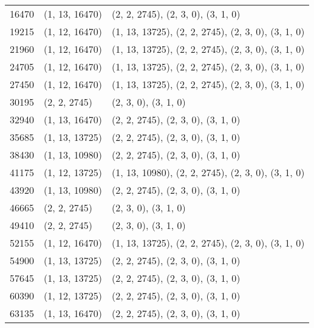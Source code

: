 \begin{longtable}{@{\extracolsep{\fill}}lll}
    16470              & (1, 13, 16470)              & (2, 2, 2745), (2, 3, 0), (3, 1, 0)                  \\
    19215              & (1, 12, 16470)              & (1, 13, 13725), (2, 2, 2745), (2, 3, 0), (3, 1, 0)  \\
    21960              & (1, 12, 16470)              & (1, 13, 13725), (2, 2, 2745), (2, 3, 0), (3, 1, 0)  \\
    24705              & (1, 12, 16470)              & (1, 13, 13725), (2, 2, 2745), (2, 3, 0), (3, 1, 0)  \\
    27450              & (1, 12, 16470)              & (1, 13, 13725), (2, 2, 2745), (2, 3, 0), (3, 1, 0)  \\
    30195              & (2, 2, 2745)                & (2, 3, 0), (3, 1, 0)                                \\
    32940              & (1, 13, 16470)              & (2, 2, 2745), (2, 3, 0), (3, 1, 0)                  \\
    35685              & (1, 13, 13725)              & (2, 2, 2745), (2, 3, 0), (3, 1, 0)                  \\
    38430              & (1, 13, 10980)              & (2, 2, 2745), (2, 3, 0), (3, 1, 0)                  \\
    41175              & (1, 12, 13725)              & (1, 13, 10980), (2, 2, 2745), (2, 3, 0), (3, 1, 0)  \\
    43920              & (1, 13, 10980)              & (2, 2, 2745), (2, 3, 0), (3, 1, 0)                  \\
    46665              & (2, 2, 2745)                & (2, 3, 0), (3, 1, 0)                                \\
    49410              & (2, 2, 2745)                & (2, 3, 0), (3, 1, 0)                                \\
    52155              & (1, 12, 16470)              & (1, 13, 13725), (2, 2, 2745), (2, 3, 0), (3, 1, 0)  \\
    54900              & (1, 13, 13725)              & (2, 2, 2745), (2, 3, 0), (3, 1, 0)                  \\
    57645              & (1, 13, 13725)              & (2, 2, 2745), (2, 3, 0), (3, 1, 0)                  \\
    60390              & (1, 12, 13725)              & (2, 2, 2745), (2, 3, 0), (3, 1, 0)                  \\
    63135              & (1, 13, 16470)              & (2, 2, 2745), (2, 3, 0), (3, 1, 0)                  \\

\end{longtable}
